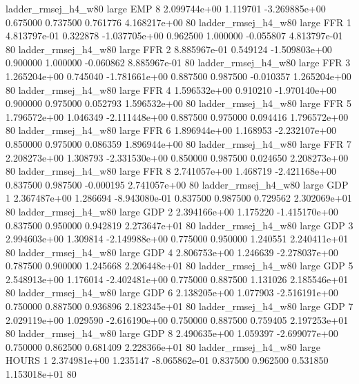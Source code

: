 ladder_rmsej_h4_w80      large      EMP                 8 2.099744e+00      1.119701 -3.269885e+00 0.675000 0.737500       0.761776 4.168217e+00 80
ladder_rmsej_h4_w80      large      FFR                 1 4.813797e-01      0.322878 -1.037705e+00 0.962500 1.000000      -0.055807 4.813797e-01 80
ladder_rmsej_h4_w80      large      FFR                 2 8.885967e-01      0.549124 -1.509803e+00 0.900000 1.000000      -0.060862 8.885967e-01 80
ladder_rmsej_h4_w80      large      FFR                 3 1.265204e+00      0.745040 -1.781661e+00 0.887500 0.987500      -0.010357 1.265204e+00 80
ladder_rmsej_h4_w80      large      FFR                 4 1.596532e+00      0.910210 -1.970140e+00 0.900000 0.975000       0.052793 1.596532e+00 80
ladder_rmsej_h4_w80      large      FFR                 5 1.796572e+00      1.046349 -2.111448e+00 0.887500 0.975000       0.094416 1.796572e+00 80
ladder_rmsej_h4_w80      large      FFR                 6 1.896944e+00      1.168953 -2.232107e+00 0.850000 0.975000       0.086359 1.896944e+00 80
ladder_rmsej_h4_w80      large      FFR                 7 2.208273e+00      1.308793 -2.331530e+00 0.850000 0.987500       0.024650 2.208273e+00 80
ladder_rmsej_h4_w80      large      FFR                 8 2.741057e+00      1.468719 -2.421168e+00 0.837500 0.987500      -0.000195 2.741057e+00 80
ladder_rmsej_h4_w80      large      GDP                 1 2.367487e+00      1.286694 -8.943080e-01 0.837500 0.987500       0.729562 2.302069e+01 80
ladder_rmsej_h4_w80      large      GDP                 2 2.394166e+00      1.175220 -1.415170e+00 0.837500 0.950000       0.942819 2.273647e+01 80
ladder_rmsej_h4_w80      large      GDP                 3 2.994603e+00      1.309814 -2.149988e+00 0.775000 0.950000       1.240551 2.240411e+01 80
ladder_rmsej_h4_w80      large      GDP                 4 2.806753e+00      1.246639 -2.278037e+00 0.787500 0.900000       1.245668 2.206448e+01 80
ladder_rmsej_h4_w80      large      GDP                 5 2.548913e+00      1.176014 -2.402481e+00 0.775000 0.887500       1.131026 2.185546e+01 80
ladder_rmsej_h4_w80      large      GDP                 6 2.138205e+00      1.077903 -2.516191e+00 0.750000 0.887500       0.936896 2.182345e+01 80
ladder_rmsej_h4_w80      large      GDP                 7 2.029119e+00      1.029590 -2.616190e+00 0.750000 0.887500       0.759405 2.197253e+01 80
ladder_rmsej_h4_w80      large      GDP                 8 2.490635e+00      1.059397 -2.699077e+00 0.750000 0.862500       0.681409 2.228366e+01 80
ladder_rmsej_h4_w80      large    HOURS                 1 2.374981e+00      1.235147 -8.065862e-01 0.837500 0.962500       0.531850 1.153018e+01 80
